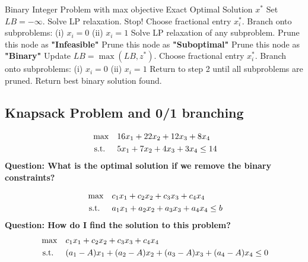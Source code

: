 
\begin{algorithm}[H]
\caption{Branch and Bound for Binary Integer Program - Maximization}\label{alg:branch-and-bound-bip}
\begin{algorithmic}[1]
\renewcommand{\algorithmicrequire}{\textbf{Input:}}
\renewcommand{\algorithmicensure}{\textbf{Output:}}
\Require Binary Integer Problem with max objective
\Ensure Exact Optimal Solution \( x^* \)
\State Set \( LB = - \infty \).
\State Solve LP relaxation. 
\State Stop!
\Else
\State Choose fractional entry \( x_i^* \).
\State Branch onto subproblems:
\Statex \hspace{2em} (i) \( x_i = 0 \)
\Statex \hspace{2em} (ii) \( x_i = 1 \)
\EndIf
\State Solve LP relaxation of any subproblem.
\State Prune this node as \textbf{"Infeasible"}
\State Prune this node as \textbf{"Suboptimal"}
\State Prune this node as \textbf{"Binary"}
\State Update \( LB = \max(LB, z^*) \).
\Else
\State Choose fractional entry \( x_i^* \).
\State Branch onto subproblems:
\Statex \hspace{2em} (i) \( x_i = 0 \)
\Statex \hspace{2em} (ii) \( x_i = 1 \)
\State Return to step 2 until all subproblems are pruned.
\EndIf
\State Return best binary solution found.
\end{algorithmic}
\end{algorithm}

%
\subsection{Knapsack Problem  and 0/1 branching}
%
%
\begin{align*}
\max \quad & 16x_1 + 22x_2 + 12x_3 + 8 x_4 \\
\mbox{ s.t. } \quad  & 5x_1 + 7x_2 + 4x_3 + 3x_4 \leq 14
\end{align*}
%
\textbf{Question: What is the optimal solution if we remove the binary constraints?}

\begin{align*}
\max \quad & c_1 x_1 + c_2 x_2 + c_3 x_3 + c_4 x_4 \\
\mbox{ s.t. } \quad  & a_1 x_1 + a_2 x_2 + a_3 x_3 + a_4 x_4 \leq b
\end{align*}
%
\textbf{Question: How do I find the solution to this problem?}
%
%
\begin{align*}
\max \quad & c_1 x_1 + c_2 x_2 + c_3 x_3 + c_4 x_4 \\
\mbox{ s.t. } \quad  & (a_1 - A)x_1 + (a_2-A) x_2 + (a_3-A) x_3 + (a_4-A) x_4 \leq 0
\end{align*}


